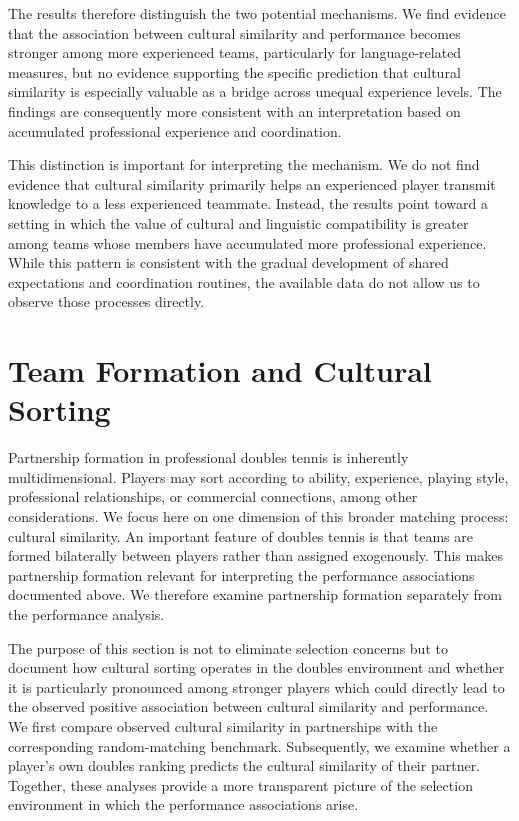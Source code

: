 \documentclass[10pt]{article}
\begin{document}
The results therefore distinguish the two potential mechanisms. We find evidence that the association between cultural similarity and performance becomes stronger among more experienced teams, particularly for language-related measures, but no evidence supporting the specific prediction that cultural similarity is especially valuable as a bridge across unequal experience levels. The findings are consequently more consistent with an interpretation based on accumulated professional experience and coordination.

This distinction is important for interpreting the mechanism. We do not find evidence that cultural similarity primarily helps an experienced player transmit knowledge to a less experienced teammate. Instead, the results point toward a setting in which the value of cultural and linguistic compatibility is greater among teams whose members have accumulated more professional experience. While this pattern is consistent with the gradual development of shared expectations and coordination routines, the available data do not allow us to observe those processes directly.



\section{Team Formation and Cultural Sorting}
Partnership formation in professional doubles tennis is inherently multidimensional. Players may sort according to ability, experience, playing style, professional relationships, or commercial connections, among other considerations. We focus here on one dimension of this broader matching process: cultural similarity. An important feature of doubles tennis is that teams are formed bilaterally between players rather than assigned exogenously. This makes partnership formation relevant for interpreting the performance associations documented above. We therefore examine partnership formation separately from the performance analysis.  %


The purpose of this section is not to eliminate selection concerns but to document how cultural sorting operates in the doubles environment and whether it is particularly pronounced among  stronger players which could directly lead to the observed positive association between cultural similarity and performance. We first compare observed cultural similarity in partnerships with the corresponding random-matching benchmark. Subsequently, we examine whether a player's own doubles ranking predicts the cultural similarity of their partner. Together, these analyses provide a more transparent picture of the selection environment in which the performance associations arise.
\end{document}
